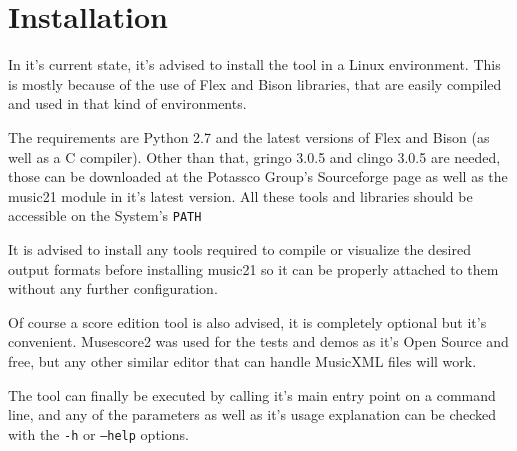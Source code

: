 \newpage

\chapter{Installation}
\label{chap:installation}
In it's current state, it's advised to install the tool in a Linux environment. This is mostly because of the use of Flex and Bison libraries, that are easily compiled and used in that kind of environments.

The requirements are Python 2.7 and the latest versions of Flex and Bison (as well as a C compiler). Other than that, gringo 3.0.5 and clingo 3.0.5 are needed, those can be downloaded at the Potassco Group's Sourceforge page \cite{potasscoweb} as well as the music21 module in it's latest version. All these tools and libraries should be accessible on the System's \texttt{PATH}

It is advised to install any tools required to compile or visualize the desired output formats before installing music21 so it can be properly attached to them without any further configuration.

Of course a score edition tool is also advised, it is completely optional but it's convenient. Musescore2 was used for the tests and demos as it's Open Source and free, but any other similar editor that can handle MusicXML files will work.

The tool can finally be executed by calling it's main entry point on a command line, and any of the parameters as well as it's usage explanation can be checked with the \texttt{-h} or \texttt{--help} options.